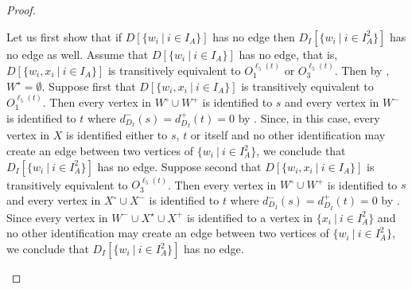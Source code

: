 \begin{proof}
\begin{claimproof}
Let us first show that if $D[\{w_i~|~i \in I_A\}]$ has no edge then $D_I[\{w_i~|~i \in I_A^2\}]$ has no edge as well. 
Assume that $D[\{w_i~|~i \in I_A\}]$ has no edge, that is, $D[\{w_i,x_i~|~i \in I_A\}]$ is transitively equivalent to $O_1^{\ell_5(t)}$ or $O_3^{\ell_5(t)}$.
Then by , $W^\star = \emptyset$.
Suppose first that $D[\{w_i,x_i~|~i \in I_A\}]$ is transitively equivalent to $O_1^{\ell_5(t)}$. 
Then every vertex in $W^\circ \cup W^+$ is identified to $s$ and every vertex in $W^-$ is identified to $t$ 
where $d^-_{D_I}(s) = d^+_{D_I}(t) = 0$ by .
Since, in this case, every vertex in $X$ is identified either to $s$, $t$ or itself 
and no other identification may create an edge between two vertices of $\{w_i~|~i \in I_A^2\}$,
we conclude that $D_I[\{w_i~|~i \in I_A^2\}]$ has no edge.
Suppose second that $D[\{w_i,x_i~|~i \in I_A\}]$ is transitively equivalent to $O_3^{\ell_5(t)}$.
Then every vertex in $W^\circ \cup W^+$ is identified to $s$ and every vertex in $X^\circ \cup X^-$ is identified to $t$
where $d^-_{D_I}(s) = d^+_{D_I}(t) = 0$ by .
Since every vertex in $W^- \cup X^\star \cup X^+$ is identified to a vertex in $\{x_i~|~i \in I_A^2\}$ 
and no other identification may create an edge between two vertices of $\{w_i~|~i \in I_A^2\}$,
we conclude that $D_I[\{w_i~|~i \in I_A^2\}]$ has no edge.


\end{claimproof}
\end{proof}
